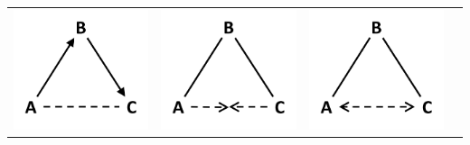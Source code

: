 \begin{table}[]
\begin{tabularx}{\textwidth}{>{\raggedright}p{3.5cm}>{\raggedright}p{3.5cm}>{\raggedright}p{3.5cm}>{\raggedright}p{3.5cm}}
\includegraphics[width=0.7\linewidth]{Images/CDT_brokerage} \end{minipage}  & \begin{minipage}{.2\textwidth} \centering \includegraphics[width=0.7\linewidth]{Images/TG_brokerage_1} \end{minipage}  & \begin{minipage}{.2\textwidth} \centering \includegraphics[width=0.7\linewidth]{Images/TI_brokerage} \end{minipage}   \\

\end{tabularx}
\end{table}
